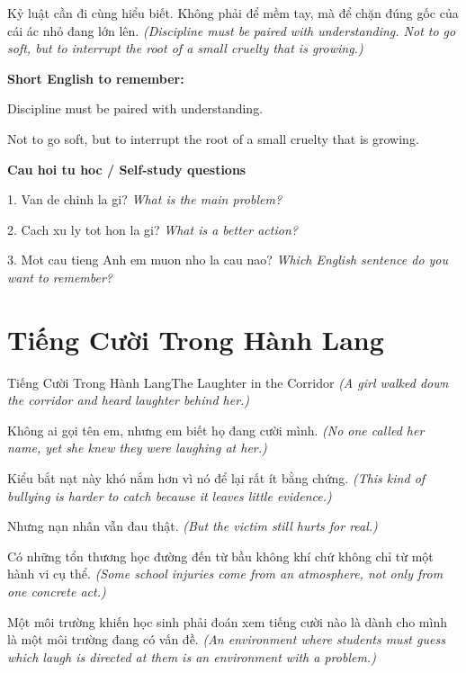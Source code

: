 \begin{baihoc}
Kỷ luật cần đi cùng hiểu biết. Không phải để mềm tay, mà để chặn đúng gốc của cái ác nhỏ đang lớn lên.
\textit{(Discipline must be paired with understanding. Not to go soft, but to interrupt the root of a small cruelty that is growing.)}
\end{baihoc}

\begin{ghinhoanh}
\textbf{Short English to remember:}

Discipline must be paired with understanding.

Not to go soft, but to interrupt the root of a small cruelty that is growing.

\end{ghinhoanh}

\begin{tuhocnhanh}
\textbf{Cau hoi tu hoc / Self-study questions}

1. Van de chinh la gi? \textit{What is the main problem?}

2. Cach xu ly tot hon la gi? \textit{What is a better action?}

3. Mot cau tieng Anh em muon nho la cau nao? \textit{Which English sentence do you want to remember?}
\end{tuhocnhanh}
\ngancach

\section{Tiếng Cười Trong Hành Lang}
\begin{truyen}{Tiếng Cười Trong Hành Lang}{The Laughter in the Corridor}
\textit{(A girl walked down the corridor and heard laughter behind her.)}

Không ai gọi tên em, nhưng em biết họ đang cười mình.
\textit{(No one called her name, yet she knew they were laughing at her.)}

Kiểu bắt nạt này khó nắm hơn vì nó để lại rất ít bằng chứng.
\textit{(This kind of bullying is harder to catch because it leaves little evidence.)}

Nhưng nạn nhân vẫn đau thật.
\textit{(But the victim still hurts for real.)}

Có những tổn thương học đường đến từ bầu không khí chứ không chỉ từ một hành vi cụ thể.
\textit{(Some school injuries come from an atmosphere, not only from one concrete act.)}

Một môi trường khiến học sinh phải đoán xem tiếng cười nào là dành cho mình là một môi trường đang có vấn đề.
\textit{(An environment where students must guess which laugh is directed at them is an environment with a problem.)}

\end{truyen}


